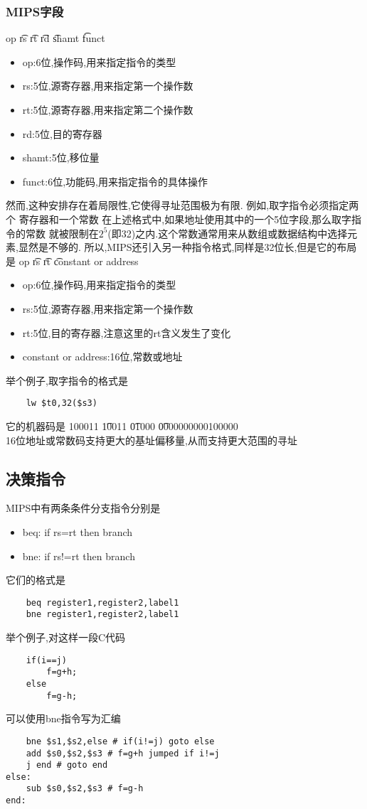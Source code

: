 \documentclass{ctexart}
\begin{document}
\subsubsection{MIPS字段}
op \t rs \t rt \t rd \t shamt \t funct \\
\begin{itemize}
    \item op:6位,操作码,用来指定指令的类型
    \item rs:5位,源寄存器,用来指定第一个操作数
    \item rt:5位,源寄存器,用来指定第二个操作数
    \item rd:5位,目的寄存器
    \item shamt:5位,移位量
    \item funct:6位,功能码,用来指定指令的具体操作
\end{itemize}
然而,这种安排存在着局限性,它使得寻址范围极为有限.
例如,取字指令必须指定两个
寄存器和一个常数 在上述格式中,如果地址使用其中的一个5位字段,那么取字指令的常数
就被限制在$2^5$(即32)之内.这个常数通常用来从数组或数据结构中选择元素,显然是不够的.
所以,MIPS还引入另一种指令格式,同样是32位长,但是它的布局是
op \t rs \t rt \t constant or address \\
\begin{itemize}
    \item op:6位,操作码,用来指定指令的类型
    \item rs:5位,源寄存器,用来指定第一个操作数
    \item rt:5位,目的寄存器,注意这里的rt含义发生了变化
    \item constant or address:16位,常数或地址
\end{itemize}
举个例子,取字指令的格式是
\begin{lstlisting}
    lw $t0,32($s3)
\end{lstlisting}
它的机器码是
100011 \t 10011 \t 01000 \t 0000000000100000 \\
16位地址或常数码支持更大的基址偏移量,从而支持更大范围的寻址\\
\subsection{决策指令}
MIPS中有两条条件分支指令分别是
\begin{itemize}
    \item beq: if rs=rt then branch
    \item bne: if rs!=rt then branch
\end{itemize}
它们的格式是
\begin{lstlisting}
    beq register1,register2,label1
    bne register1,register2,label1
\end{lstlisting}

举个例子,对这样一段C代码
\begin{lstlisting}
    if(i==j)
        f=g+h;
    else
        f=g-h;
\end{lstlisting}
可以使用bne指令写为汇编
\begin{lstlisting}
    bne $s1,$s2,else # if(i!=j) goto else
    add $s0,$s2,$s3 # f=g+h jumped if i!=j
    j end # goto end
else:
    sub $s0,$s2,$s3 # f=g-h
end:
\end{lstlisting}
\end{document}
